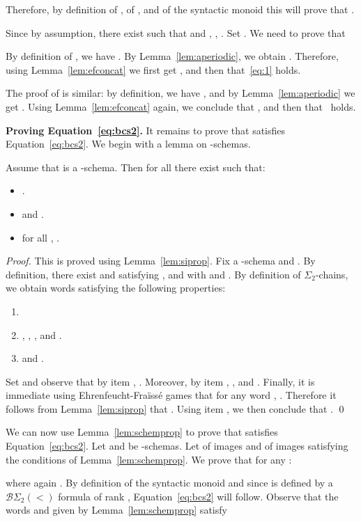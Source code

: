 \documentclass[envcountsame]{llncs}
\newcommand{\efgame}{Ehrenfeucht-Fra\"iss\'e\xspace}
\newcommand{\sic}[1]{\ensuremath{\Sigma_{#1}}\xspace}
\newcommand{\bswd}{\ensuremath{\mathcal{B}\Sigma_{2}(<)}\xspace}
\newcommand\qchains[1]{\ensuremath{\sic{#1}}-chains\xspace}
\newcommand\dchains{\qchains{2}}
\begin{document}
Therefore, by definition of , of , and of the syntactic monoid
this will prove that .

Since  by assumption, there
exist  such that  and
, , . Set . We need to prove that

By definition of , we have . By Lemma~\ref{lem:aperiodic}, we obtain
. Therefore, using 
Lemma~\ref{lem:efconcat} we first get , and
then that~\eqref{eq:1} holds.

The proof of  is similar: by definition, we have , and by
Lemma~\ref{lem:aperiodic} we get . Using
Lemma~\ref{lem:efconcat} again, we conclude that , and then
that~ holds.

\medskip
\noindent
{\bf Proving Equation~\eqref{eq:bcs2}.} It remains to prove that
 satisfies Equation~\eqref{eq:bcs2}. We begin with a lemma
on -schemas.

\begin{lemma} \label{lem:schemprop}
  Assume that  is a -schema. Then for all  there exist  such that:
  \begin{itemize}
  \item .
  \item  and .
  \item for all , .
  \end{itemize}
\end{lemma}

\begin{proof}
  This is proved using Lemma~\ref{lem:siprop}. Fix a -schema
   and . By definition, there exist  and  satisfying ,
   and  with  and
  . By definition
  of \dchains, we obtain words  satisfying
  the following properties:
  \begin{enumerate}[label=]
  \item 
  \item ,
    , ,  and .
  \item  and .
  \end{enumerate}

  Set  and observe that
  by item , . Moreover, by item , ,
   and . Finally, it is immediate using \efgame games that for any
  word , . Therefore it follows
  from Lemma~\ref{lem:siprop} that . Using item , we then
  conclude that . \qed  
\end{proof}

We can now use Lemma~\ref{lem:schemprop} to prove that 
satisfies Equation~\eqref{eq:bcs2}. Let  and
 be -schemas. Let  of images
 and  of images 
satisfying the conditions of Lemma~\ref{lem:schemprop}. We prove that
for any :

where again . By definition of the syntactic monoid and since  is defined by a 
\bswd formula of rank , Equation~\eqref{eq:bcs2} will
follow. Observe that the words  and  given by
Lemma~\ref{lem:schemprop} satisfy
\end{document}
